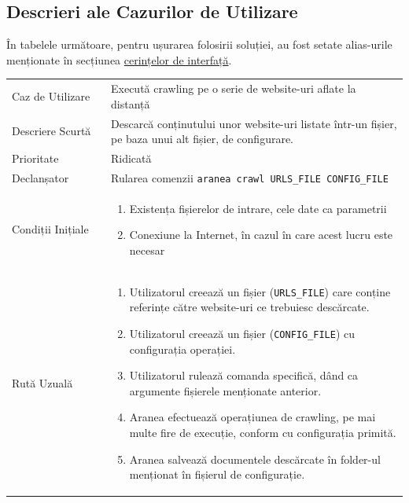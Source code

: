 \documentclass[12pt]{article}
\begin{document}
\newpage

\subsection{Descrieri ale Cazurilor de Utilizare}

În tabelele următoare, pentru ușurarea folosirii soluției, au fost setate alias-urile menționate în secțiunea \hyperlink{interface_link}{cerințelor de interfață}. \\

\begin{table}[H]
    \centering
    \begin{tabular}{ |p{0.25\linewidth} | p{0.75\linewidth}| }
        \hline
        Caz de Utilizare & Execută crawling pe o serie de website-uri aflate la distanță \\
        Descriere Scurtă & Descarcă conținutului unor website-uri listate într-un fișier, pe baza unui alt fișier, de configurare.\\
        Prioritate & Ridicată \\
        Declanșator & Rularea comenzii \texttt{aranea crawl URLS_FILE CONFIG_FILE} \\
        Condiții Inițiale & \begin{enumerate}
                                \item Existența fișierelor de intrare, cele date ca parametrii
                                \item Conexiune la Internet, în cazul în care acest lucru este necesar
                            \end{enumerate} \\
        Rută Uzuală & \begin{enumerate} 
                          \item Utilizatorul creează un fișier (\texttt{URLS_FILE}) care conține referințe către website-uri ce trebuiesc descărcate.
                          \item Utilizatorul creează un fișier (\texttt{CONFIG_FILE}) cu configurația operației.
                          \item Utilizatorul rulează comanda specifică, dând ca argumente fișierele menționate anterior.
                          \item Aranea efectuează operațiunea de crawling, pe mai multe fire de execuție, conform cu configurația primită.
                          \item Aranea salvează documentele descărcate în folder-ul menționat în fișierul de configurație.

\end{enumerate}
\end{tabular}
\end{table}
\end{document}
